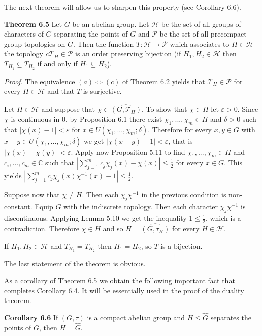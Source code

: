 \documentclass[12pt]{article}
\begin{document}
\begin{itemize}
\begin{itemize}
    The next theorem will allow us to sharpen this property (see Corollary 6.6).


\textbf{Theorem 6.5} Let $G$ be an abelian group. Let $\mathcal{H}$ be the set of all groups of characters of $G$ separating the
points of $G$ and $\mathcal{P}$ be the set of all precompact group topologies on $G$. Then the function $T : \mathcal{H} \to \mathcal{P}$ which
associates to $H \in \mathcal{H}$ the topology $c\mathcal{T}_H \in \mathcal{P}$ is an order preserving bijection (if $H_1, H_2 \in \mathcal{H}$ then $T_{H_1} \subseteq T_{H_2}$ if and
only if $H_1 \subseteq H_2$).


\emph{Proof.} The equivalence $(a)\Leftrightarrow(c)$ of Theorem 6.2 yields that $\mathcal{T}_H \in \mathcal{P}$ for every $H \in \mathcal{H}$ and that $T$ is surjective.

    
    Let $H \in \mathcal{H}$ and suppose that $\chi \in \hat{(G, \mathcal{T}_H)}$. To show that $\chi \in H$ let $\varepsilon > 0$. Since $\chi$ is continuous in 0,
by Proposition 6.1 there exist $\chi_1, . . . , \chi_m \in H$ and $\delta > 0$ such that $|\chi(x) - 1| < \varepsilon$ for $x \in U(\chi_1, . . . , \chi_m; \delta)$.
Therefore for every $x, y \in G$ with $x - y \in U(\chi_1, . . . , \chi_m; \delta)$ we get $|\chi(x - y) - 1| < \varepsilon$, that is $|\chi(x) - \chi(y)| < \varepsilon$.
Apply now Proposition 5.11 to find $\chi_1, . . . , \chi_m \in H$ and $c_i, . . . , c_m \in \mathbb{C}$ such that $|\sum^m_{j=1} c_j \chi_j (x) - \chi(x)| \leq \frac{1}{2}$
for every $x \in G$. This yields $|\sum^m_{j=1} c_j \chi_j (x)\chi^{-1}(x) - 1| \leq \frac{1}{2}$.


    Suppose now that $\chi \neq H$. Then each $\chi_j \chi^{-1}$ in the previous condition is non-constant. Equip $G$ with the
indiscrete topology. Then each character $\chi_j \chi^{-1}$ is discontinuous. Applying Lemma 5.10 we get the inequality
1$ \leq \frac{1}{2}$, which is a contradiction. Therefore $\chi \in H$ and so $H = \hat{(G, \tau_H)}$ for every $H \in \mathcal{H}$.


    If $H_1, H_2 \in \mathcal{H}$ and $T_{H_1} = T_{H_2}$ then $H_1 = H_2$, so $T$ is a bijection.


    The last statement of the theorem is obvious.


    As a corollary of Theorem 6.5 we obtain the following important fact that completes Corollary 6.4. It will
be essentially used in the proof of the duality theorem.


\textbf{Corollary 6.6} If $(G, \tau)$ is a compact abelian group and $H \leq \hat{G}$ separates the points of $G$, then $H = \hat{G}$.



\end{itemize}
\end{itemize}
\end{document}

